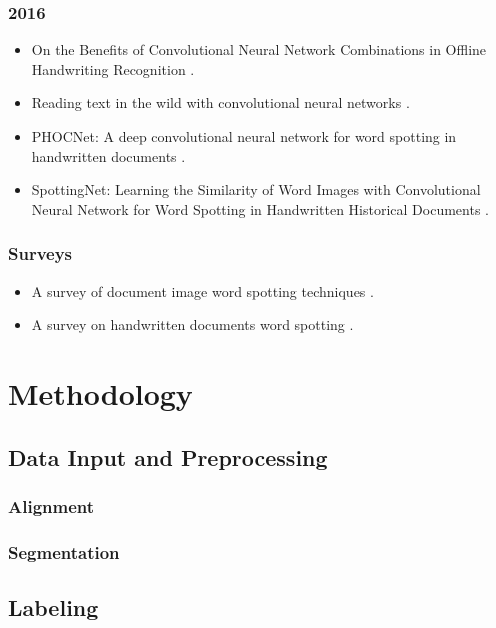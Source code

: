 \documentclass[final]{ukthesis}
\begin{document}
\subsection{2016}
\begin{itemize}
\item On the Benefits of Convolutional Neural Network Combinations in Offline Handwriting Recognition \cite{suryani2016benefits}.
\item Reading text in the wild with convolutional neural networks \cite{jaderberg2016reading}.
\item PHOCNet: A deep convolutional neural network for word spotting in handwritten documents \cite{sudholt2016phocnet}.
\item SpottingNet: Learning the Similarity of Word Images with Convolutional Neural Network for Word Spotting in Handwritten Historical Documents \cite{zhong2016spottingnet}.
\end{itemize}



\subsection{Surveys}
\begin{itemize}
\item A survey of document image word spotting techniques \cite{giotis2017survey}.

\item A survey on handwritten documents word spotting \cite{ahmed2017survey}.
\end{itemize}
\copyrightnotice





\chapter{Methodology}
\section{Data Input and Preprocessing}
\subsection{Alignment}
\subsection{Segmentation}


\section{Labeling}
\end{document}
